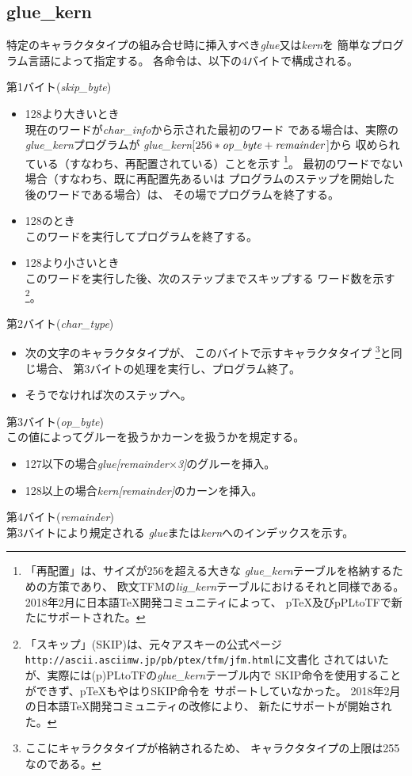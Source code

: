 \documentclass[twoside]{jarticle}
\begin{document}
\subsection{glue\_kern}
特定のキャラクタタイプの組み合せ時に挿入すべき{\it glue}又は{\it kern}を
簡単なプログラム言語によって指定する。
各命令は、以下の4バイトで構成される。
\begin{description}
\item{第1バイト({\it skip\_byte})}
	\begin{itemize}
	\item 128より大きいとき\\
		現在のワードが{\it char\_info}から示された最初のワード
		である場合は、実際の{\it glue\_kern}プログラムが
		{\it glue\_kern}[$256*{\it op\_byte}+{\it remainder}$]から
		収められている（すなわち、再配置されている）ことを示す
		\footnote{「再配置」は、サイズが256を超える大きな
		{\it glue\_kern}テーブルを格納するための方策であり、
		欧文TFMの{\it lig\_kern}テーブルにおけるそれと同様である。
		2018年2月に日本語\TeX{}開発コミュニティによって、
		p\TeX{}及びpPLtoTFで新たにサポートされた。}。
		最初のワードでない場合（すなわち、既に再配置先あるいは
		プログラムのステップを開始した後のワードである場合）は、
		その場でプログラムを終了する。
	\item 128のとき\\
		このワードを実行してプログラムを終了する。
	\item 128より小さいとき\\
		このワードを実行した後、次のステップまでスキップする
		ワード数を示す
		\footnote{「スキップ」(SKIP)は、元々アスキーの公式ページ
		{\tt http://ascii.asciimw.jp/pb/ptex/tfm/jfm.html}に文書化
		されてはいたが、実際には(p)PLtoTFの{\it glue\_kern}テーブル内で
		SKIP命令を使用することができず、p\TeX{}もやはりSKIP命令を
		サポートしていなかった。
		2018年2月の日本語\TeX{}開発コミュニティの改修により、
		新たにサポートが開始された。}。
	\end{itemize}
\item{第2バイト({\it char\_type})}
	\begin{itemize}
	\item 次の文字のキャラクタタイプが、
		このバイトで示すキャラクタタイプ
		\footnote{ここにキャラクタタイプが格納されるため、
		キャラクタタイプの上限は255なのである。}と同じ場合、
		第3バイトの処理を実行し、プログラム終了。
	\item そうでなければ次のステップへ。
	\end{itemize}
\item{第3バイト({\it op\_byte})}\\
	この値によってグルーを扱うかカーンを扱うかを規定する。
	\begin{itemize}
	\item 127以下の場合{\it glue[remainder$\times$3]}のグルーを挿入。
	\item 128以上の場合{\it kern[remainder]}のカーンを挿入。
	\end{itemize}
\item{第4バイト({\it remainder})}\\
	第3バイトにより規定される
	{\it glue}または{\it kern}へのインデックスを示す。
\end{description}
%
\end{document}
